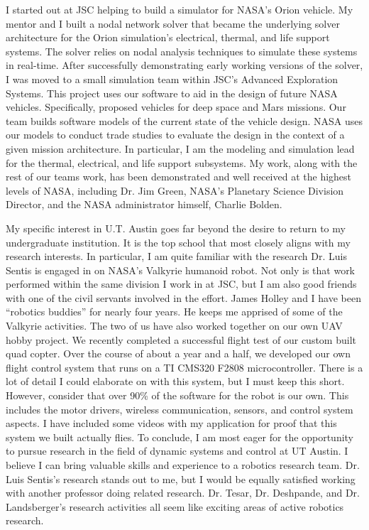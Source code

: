 \documentclass{article}
\begin{document}
I started out at JSC helping to build a simulator for NASA's Orion vehicle. My mentor and I built a nodal network solver that became the underlying solver architecture for the Orion simulation's electrical, thermal, and life support systems.
The solver relies on nodal analysis techniques to simulate these systems in real-time.
After successfully demonstrating early working versions of the solver, I was moved
to a small simulation team within JSC's Advanced Exploration Systems.
This project uses our software to aid in the design of future
NASA vehicles. Specifically, proposed vehicles for deep space and Mars missions. 
Our team builds software models of the current state of the vehicle design. NASA uses our
models to conduct trade studies to evaluate the design in the context of a given mission architecture.
In particular, I am the modeling and simulation lead for the thermal, electrical, and life support
subsystems. My work, along with the rest of our teams work, has been demonstrated and well received 
at the highest levels of NASA, including Dr. Jim Green, NASA's Planetary Science Division Director, and 
the NASA administrator himself, Charlie Bolden.

My specific interest in U.T. Austin goes far beyond the desire to return to my undergraduate institution.
It is the top school that most closely aligns with my research interests. In particular, I am quite familiar with the research Dr. Luis Sentis is engaged in on NASA's Valkyrie humanoid robot. Not only is that work performed
within the same division I work in at JSC, but I am also good friends with one of the civil servants involved in the effort. James Holley and I have been ``robotics buddies'' for nearly four years. He keeps me apprised of some of the Valkyrie activities. The two of us have also worked together on our own UAV hobby project. We recently completed a successful flight test of our custom built quad copter. Over the course of about a year and a half, we developed our own flight control system that runs on a TI CMS320 F2808 microcontroller. There is a lot of detail I could elaborate on with this system, but I must keep this short. However, consider that over 90\% of the software for the robot is our own. This includes the motor drivers, wireless communication, sensors, and control system aspects. I have included some videos with my application for proof that this system we built actually flies. To conclude, I am most eager for the opportunity to pursue research in the field of dynamic systems and control at UT Austin. I believe I can bring valuable skills and experience to a robotics research team. Dr. Luis Sentis's research stands out to me, but I would be equally satisfied working with another professor doing related research. Dr. Tesar, Dr. Deshpande, and Dr. Landsberger's research activities all seem like exciting areas of active robotics research.
\end{document}
